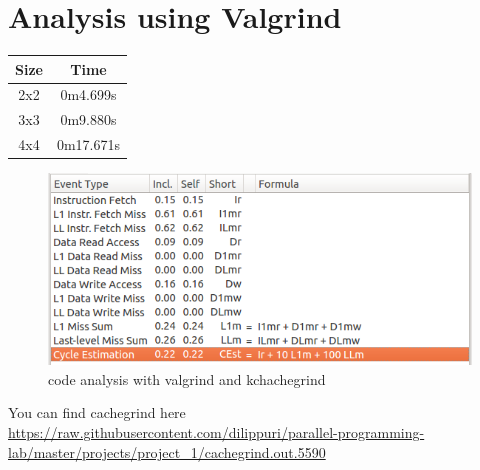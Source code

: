 \documentclass{sem5}
\begin{document}
\section{Analysis using Valgrind}
\begin{center}
\begin{tabular}{|c|c|}
\hline
Size & Time \\
\hline
2x2 & 0m4.699s\\
\hline
3x3 & 0m9.880s\\
\hline
4x4 & 0m17.671s\\
\hline

\end{tabular}
\end{center}
\begin{figure}[htbp]
\centering
\includegraphics[scale=.5]{11.png}
\caption{code analysis with valgrind and kchachegrind}
\end{figure}
You can find cachegrind here
\url{https://raw.githubusercontent.com/dilippuri/parallel-programming-lab/master/projects/project_1/cachegrind.out.5590}
\end{document}
